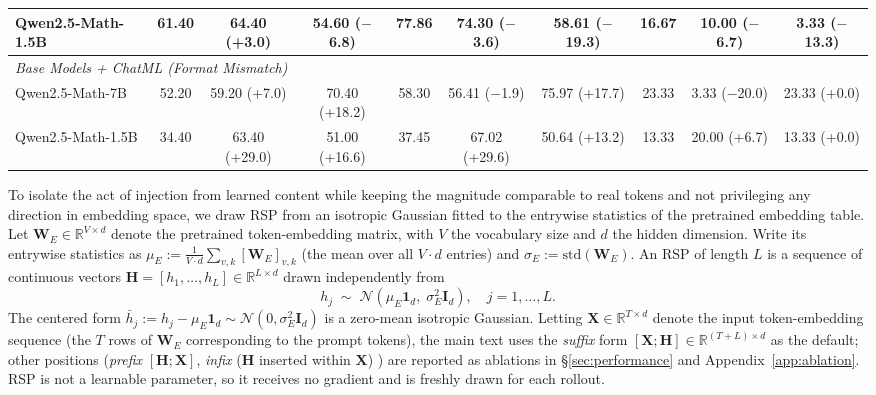 \begin{table}[!t]
{\begin{tabular}{l ccc ccc ccc}
Qwen2.5-Math-1.5B      & 61.40 & \cellcolor{blue!10}64.40 {\scriptsize(+3.0)}    & \cellcolor{blue!10}54.60 {\scriptsize($-$6.8)}  & 77.86 & \cellcolor{blue!10}74.30 {\scriptsize($-$3.6)}  & \cellcolor{blue!10}58.61 {\scriptsize($-$19.3)} & 16.67 & \cellcolor{blue!10}10.00 {\scriptsize($-$6.7)}  & \cellcolor{blue!10}3.33  {\scriptsize($-$13.3)} \\
\midrule
\multicolumn{10}{l}{\textit{Base Models + ChatML (Format Mismatch)}} \\
\midrule
Qwen2.5-Math-7B        & 52.20 & \cellcolor{blue!10}59.20 {\scriptsize(+7.0)}    & \cellcolor{blue!10}70.40 {\scriptsize(+18.2)}   & 58.30 & \cellcolor{blue!10}56.41 {\scriptsize($-$1.9)}  & \cellcolor{blue!10}75.97 {\scriptsize(+17.7)} & 23.33 & \cellcolor{blue!10}3.33  {\scriptsize($-$20.0)} & \cellcolor{blue!10}23.33 {\scriptsize(+0.0)}  \\
Qwen2.5-Math-1.5B      & 34.40 & \cellcolor{blue!10}63.40 {\scriptsize(+29.0)}   & \cellcolor{blue!10}51.00 {\scriptsize(+16.6)}   & 37.45 & \cellcolor{blue!10}67.02 {\scriptsize(+29.6)}   & \cellcolor{blue!10}50.64 {\scriptsize(+13.2)} & 13.33 & \cellcolor{blue!10}20.00 {\scriptsize(+6.7)}    & \cellcolor{blue!10}13.33 {\scriptsize(+0.0)}  \\
\bottomrule
\end{tabular}}
\end{table}

To isolate the act of injection from learned content while keeping the magnitude comparable to real tokens and not privileging any direction in embedding space, we draw RSP from an isotropic Gaussian fitted to the entrywise statistics of the pretrained embedding table. Let $\mathbf{W}_E \in \mathbb{R}^{V\times d}$ denote the pretrained token-embedding matrix, with $V$ the vocabulary size and $d$ the hidden dimension. Write its entrywise statistics as $\mu_E := \tfrac{1}{V\cdot d}\sum_{v,k}[\mathbf{W}_E]_{v,k}$ (the mean over all $V\cdot d$ entries) and $\sigma_E := \mathrm{std}(\mathbf{W}_E)$. An RSP of length $L$ is a sequence of continuous vectors $\mathbf{H} = [h_1,\dots,h_L]\in\mathbb{R}^{L\times d}$ drawn independently from
\begin{equation}\label{eq:rsp_def}
h_j \;\sim\; \mathcal{N}(\mu_E\mathbf{1}_d,\;\sigma_E^2\mathbf{I}_d), \quad j=1,\dots,L.
\end{equation}
The centered form $\bar h_j := h_j - \mu_E\mathbf{1}_d \sim \mathcal{N}(0,\sigma_E^2\mathbf{I}_d)$ is a zero-mean isotropic Gaussian. Letting $\mathbf{X} \in \mathbb{R}^{T\times d}$ denote the input token-embedding sequence (the $T$ rows of $\mathbf{W}_E$ corresponding to the prompt tokens), the main text uses the \emph{suffix} form $[\mathbf{X};\mathbf{H}] \in \mathbb{R}^{(T+L)\times d}$ as the default; other positions (\emph{prefix} $[\mathbf{H};\mathbf{X}]$, \emph{infix} ($\mathbf{H}$ inserted within $\mathbf{X}$) \citep{kang2025model, xu2025softcot, ye2025thinking, zhang2025memgen}) are reported as ablations in \S\ref{sec:performance} and Appendix~\ref{app:ablation}. RSP is not a learnable parameter, so it receives no gradient and is freshly drawn for each rollout.

